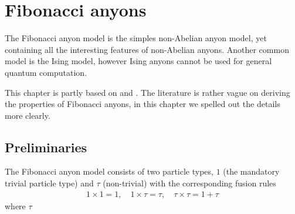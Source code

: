 \documentclass[a4paper,10pt,oneside]{book}
\theoremstyle{plain}
\theoremstyle{definition}
\theoremstyle{remark}
\begin{document}
\chapter{Fibonacci anyons}\label{fibonacci anyons}

The Fibonacci anyon model is the simples non-Abelian anyon model, yet containing all the interesting features of non-Abelian anyons. Another common model is the Ising model, however Ising anyons cannot be used for general quantum computation.

This chapter is partly based on \cite{preskill} and \cite{topological quantum compiling}. The literature is rather vague on deriving the properties of Fibonacci anyons, in this chapter we spelled out the details more clearly.

\section{Preliminaries}\label{sec:fibonacci fusion space examples}

The Fibonacci anyon model consists of two particle types, $1$ (the mandatory trivial particle type) and $τ$ (non-trivial) with the corresponding fusion rules
\begin{align*}
  1 \times 1 = 1, \quad
  1 \times τ = τ, \quad
  τ \times τ = 1 + τ
\end{align*}
where $\tau$
\end{document}

